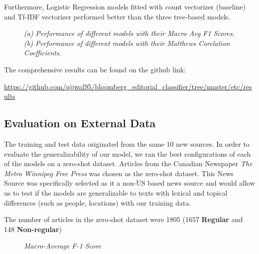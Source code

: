 \documentclass[11pt]{article}
\begin{document}
Furthermore, Logistic Regression models fitted with count vectorizer (baseline) and Tf-IDF vectorizer performed better than the three tree-based models.

\begin{figure}[!htb]
\caption{\label{fig:results}  \textit{(a) Performance of different models with their Macro Avg F1 Scores. (b) Performance of different models with their Matthews Corelation Coefficients.}}
\end{figure}



\noindent The comprehensive results can be found on the github link:

\noindent \url{https://github.com/ujjwal95/bloomberg_editorial_classifier/tree/master/etc/results}
\medskip


\subsection{Evaluation on External Data}
The training and test data originated from the same 10 new sources. In order to evaluate the generalizability of our model, we ran the best configurations of each of the models on a zero-shot dataset. Articles from the Canadian Newspaper \textit{The Metro Winnipeg Free Press} was chosen as the zero-shot dataset. This News Source was specifically selected as it a non-US based news source and would allow us to test if the models are generalizable to texts with lexical and topical differences (such as people, locations) with our training data.

The number of articles in the zero-shot dataset were 1805 (1657 \textbf{Regular} and 148 \textbf{Non-regular})
\begin{figure}[!htb]
\caption{\label{fig:f1}  \textit{Macro-Average F-1 Score}}
\end{figure}
\end{document}
